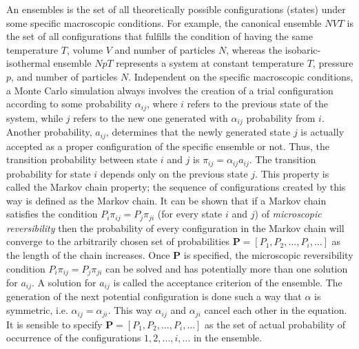 An ensembles is the set of all theoretically possible configurations (states) under some specific macroscopic conditions. For example, the canonical ensemble $NVT$ is the set of all configurations that fulfills the condition of having the same temperature $T$, volume $V$ and number of particles $N$, whereas the isobaric-isothermal ensemble $NpT$ represents a system at constant temperature $T$, pressure $p$, and number of particles $N$. Independent on the specific macroscopic conditions, a Monte Carlo simulation always involves the creation of a trial configuration according to some probability $\alpha_{ij}$, where $i$ refers to the previous state of the system, while $j$ refers to the new one generated with $\alpha_{ij}$ probability from $i$. Another probability, $a_{ij}$, determines that the newly generated state $j$ is actually accepted as a proper configuration of the specific ensemble or not. Thus, the transition probability between state $i$ and $j$ is $\pi_{ij}=\alpha_{ij} a_{ij}$. The transition probability for state $i$ depends only on the previous state $j$. This property is called the Markov chain property; the sequence of configurations created by this way is defined as the Markov chain. It can be shown that if a Markov chain satisfies the condition $P_i \pi_{ij}=P_j \pi_{ji}$ (for every state $i$ and $j$) of \textit{microscopic reversibility} then the probability of every configuration in the Markov chain will converge to the arbitrarily chosen set of probabilities $\textbf{P}=[P_1,P_2,...,P_i,...]$ as the length of the chain increases. Once \textbf{P} is specified, the microscopic reversibility condition $P_i \pi_{ij}=P_j \pi_{ji}$ can be solved and has potentially more than one solution for $a_{ij}$. A solution for $a_{ij}$ is called the acceptance criterion of the ensemble. The generation of the next potential configuration is done such a way that $\alpha$ is symmetric, i.e. $\alpha_{ij}=\alpha_{ji}$. This way $\alpha_{ij}$ and $\alpha_{ji}$ cancel each other in the equation. It is sensible to specify $\textbf{P}=[P_1,P_2,...,P_i,...]$ as the set of actual probability of occurrence of the configurations $1,2,...,i,...$ in the ensemble.\\
